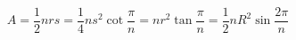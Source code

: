 \documentclass[12pt]{article}
\begin{document}
\[
    A = \frac{1}{2}nrs = \frac{1}{4}ns^2\cot \frac{\pi}{n} = nr^2\tan \frac{\pi}{n} = \frac{1}{2}nR^2\sin \frac{2\pi}{n}
\]
\end{document}
